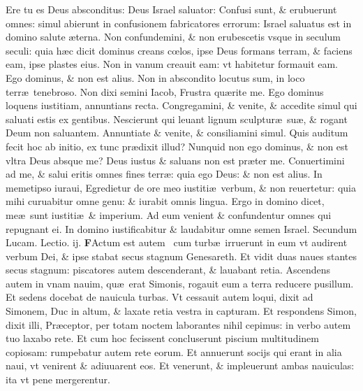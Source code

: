 \documentclass[a5paper,10pt]{book}
\def\leftmarginnote{%
	\lrmarginnote{\hskip -\marginparsep \hskip -6.5em}}
\def\rightmarginnote{%
	\lrmarginnote{\hskip\columnwidth \hskip -1em}}
\def\ae{æ}
\def\oe{œ}
\begin{document}
\begin{multicols*}{2}
Ere\rightmarginnote{c. 45.} tu es Deus absconditus: Deus Israel saluator: Confusi sunt, \& erubuerunt omnes: simul abierunt in confusionem fabricatores errorum: Israel saluatus est in domino salute \ae terna.
Non confundemini, \& non erubescetis vsque in seculum seculi: quia h\ae c dicit dominus creans c\oe los, ipse Deus formans terram, \& faciens eam, ipse plastes eius.
Non in vanum creauit eam: vt habitetur formauit eam.
Ego dominus, \& non est alius. Non in abscondito locutus sum, in loco terr\ae \ tenebroso.
Non dixi semini Iacob, Frustra qu\ae rite me.
Ego dominus loquens iustitiam, annuntians recta.
Congregamini, \& venite, \& accedite simul qui saluati estis ex gentibus.
Nescierunt qui leuant lignum sculptur\ae \ su\ae , \& rogant Deum non saluantem.
Annuntiate \& venite, \& consiliamini simul.
Quis auditum fecit hoc ab initio, ex tunc pr\ae dixit illud?
Nunquid non ego dominus, \& non est vltra Deus absque me?
Deus iustus \& saluans non est pr\ae ter me.
Conuertimini ad me, \& salui eritis omnes fines terr\ae : quia ego Deus: \& non est alius.
In memetipso iuraui, Egredietur de ore meo iustiti\ae \ verbum, \& non reuertetur: quia mihi curuabitur omne genu: \& iurabit omnis lingua.
Ergo in domino dicet, me\ae \ sunt iustiti\ae \ \& imperium.
Ad eum venient \& confundentur omnes qui repugnant ei.
In domino iustificabitur \& laudabitur omne semen Israel.
\fancyhead[C]{\color{red} Feria. iiij. Dominic\ae . ij. aduentus}
\newline \color{red} Secundum Lucam. \hfill Lectio. ij. \color{black}
\vspace{-.25em}
\lettrine[lines=2]{\bfseries \color{red} F}{}Actum\leftmarginnote{\begin{flushright}c.5.a\end{flushright}} est autem \textdagger \ cum turb\ae \ irruerunt in eum vt audirent verbum Dei, \& ipse stabat secus stagnum Genesareth.
Et vidit duas naues stantes secus stagnum: piscatores autem descenderant, \& lauabant retia.
Ascendens autem in vnam nauim, qu\ae \ erat Simonis, rogauit eum a terra reducere pusillum. Et sedens docebat de nauicula turbas.
Vt cessauit autem loqui, dixit ad Simonem, Duc in altum, \& laxate retia vestra in capturam.
Et respondens Simon, dixit illi, Pr\ae ceptor, per totam noctem laborantes nihil cepimus: in verbo autem tuo laxabo rete.
Et cum hoc fecissent concluserunt piscium multitudinem copiosam: rumpebatur autem rete eorum.
Et annuerunt socijs qui erant in alia naui, vt venirent \& adiuuarent eos.
Et venerunt, \& impleuerunt ambas nauiculas: ita vt pene mergerentur.

\end{multicols*}
\end{document}
